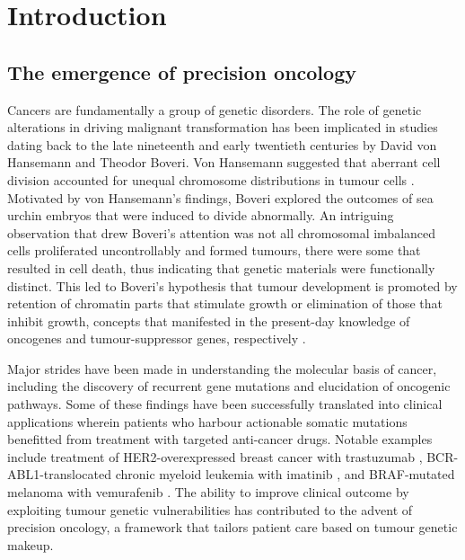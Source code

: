 
\chapter{Introduction}
\label{ch:Introduction}

\section{The emergence of precision oncology}
\label{sec:Theemergenceofprecisiononcology}

Cancers are fundamentally a group of genetic disorders. The role of genetic alterations in driving malignant transformation has been implicated in studies dating back to the late nineteenth and early twentieth centuries by David von Hansemann and Theodor Boveri. Von Hansemann suggested that aberrant cell division accounted for unequal chromosome distributions in tumour cells \cite{VonHansemann1890, Paget2006}. Motivated by von Hansemann's findings, Boveri explored the outcomes of sea urchin embryos that were induced to divide abnormally. An intriguing observation that drew Boveri's attention was not all chromosomal imbalanced cells proliferated uncontrollably and formed tumours, there were some that resulted in cell death, thus indicating that genetic materials were functionally distinct. This led to Boveri's hypothesis that tumour development is promoted by retention of chromatin parts that stimulate growth or elimination of those that inhibit growth, concepts that manifested in the present-day knowledge of oncogenes and tumour-suppressor genes, respectively \cite{Boveri1914, Paget2006}.

Major strides have been made in understanding the molecular basis of cancer, including the discovery of recurrent gene mutations and elucidation of oncogenic pathways. Some of these findings have been successfully translated into clinical applications wherein patients who harbour actionable somatic mutations benefitted from treatment with targeted anti-cancer drugs. Notable examples include treatment of \acs{HER2}-overexpressed breast cancer with trastuzumab \cite{Slamon1987, Andrulis1998, Sjogren1998, Drebin1985, Vogel2002, Seidman2008}, \acs{BCR-ABL1}-translocated chronic myeloid leukemia with imatinib \cite{Rowley1973, Druker2006}, and \acs{BRAF}-mutated melanoma with vemurafenib \cite{Chapman2011, Ravnan2012}. The ability to improve clinical outcome by exploiting tumour genetic vulnerabilities has contributed to the advent of precision oncology, a framework that tailors patient care based on tumour genetic makeup.

